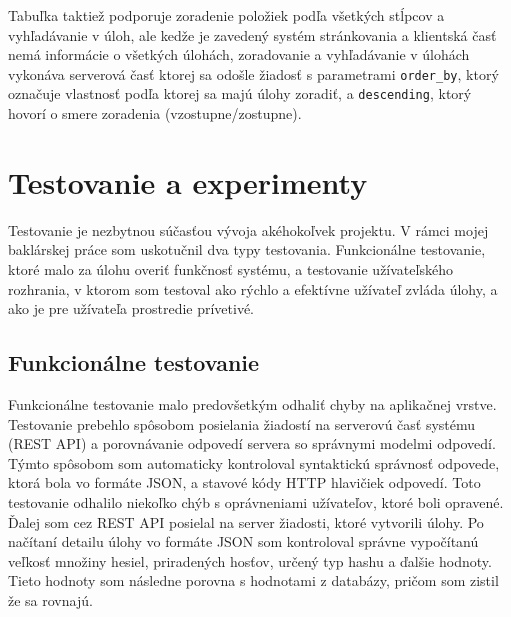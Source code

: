 \documentclass[slovak]{fitthesis}
\begin{document}
Tabuľka taktiež podporuje zoradenie položiek podľa všetkých stĺpcov a vyhľadávanie v úloh, ale kedže je zavedený systém stránkovania a klientská časť nemá informácie o všetkých úlohách, zoradovanie a vyhľadávanie v úlohách vykonáva serverová časť ktorej sa odošle žiadosť s parametrami \texttt{order\_by}, ktorý označuje vlastnosť podľa ktorej sa majú úlohy zoradiť, a \texttt{descending}, ktorý hovorí o smere zoradenia (vzostupne/zostupne).



\chapter{Testovanie a experimenty}
Testovanie je nezbytnou súčasťou vývoja akéhokoľvek projektu. V rámci mojej baklárskej práce som uskotučnil dva typy testovania. Funkcionálne testovanie, ktoré malo za úlohu overiť funkčnosť systému, a testovanie užívateľského rozhrania, v ktorom som testoval ako rýchlo a efektívne užívateľ zvláda úlohy, a ako je pre užívateľa  prostredie prívetivé.

\section{Funkcionálne testovanie}
Funkcionálne testovanie malo predovšetkým odhaliť chyby na aplikačnej vrstve. Testovanie prebehlo spôsobom posielania žiadostí na serverovú časť systému (REST API) a porovnávanie odpovedí servera so správnymi modelmi odpovedí. Týmto spôsobom som automaticky kontroloval syntaktickú správnosť odpovede, ktorá bola vo formáte JSON, a stavové kódy HTTP hlavičiek odpovedí. Toto testovanie odhalilo niekoľko chýb s oprávneniami užívateľov, ktoré boli opravené. Ďalej som cez REST API posielal na server žiadosti, ktoré vytvorili úlohy. Po načítaní detailu úlohy vo formáte JSON som kontroloval správne vypočítanú veľkosť množiny hesiel, priradených hosťov, určený typ hashu a ďalšie hodnoty. Tieto hodnoty som následne porovna s hodnotami z databázy, pričom som zistil že sa rovnajú.
\end{document}
